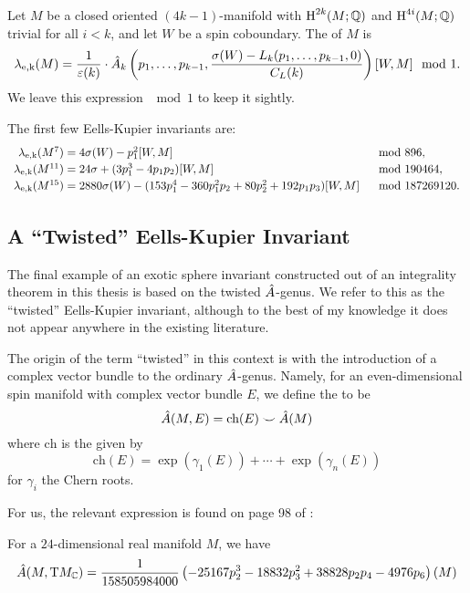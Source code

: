\begin{definition}
	Let $M$ be a closed oriented $(4k-1)$-manifold with $\operatorname{H}^{2k}(M;\mathbb{Q})$ and $\operatorname{H}^{4i}(M;\mathbb{Q})$ trivial for all $i<k$, and let $W$ be a spin coboundary. The  of $M$ is
	\[
		\lambda_{\mathrm{e,k}}(M) = \frac{1}{\varepsilon(k)}\cdot {\hat{A}}_k\left(p_1, \ldots, p_{k-1}, \frac{\sigma(W)-L_k(p_1,\ldots, p_{k-1},0)}{C_L(k)}\right)[W,M]\mod 1.
	\]
	We leave this expression $\mod 1$ to keep it sightly.
\end{definition}

\begin{example}
	The first few Eells-Kupier invariants are:
	\[
		\renewcommand{\arraystretch}{1.2}
		\begin{array}{r@{\;}ll}
			\ekinv(M^7)
			 & = 4\sigma(W) - p_1^2[W, M]
			 & \mod 896,                                                       \\
			\ekinv(M^{11})
			 & = 24\sigma + (3p_1^3-4p_1p_2)[W,M]
			 & \mod 190464,                                                    \\
			\ekinv(M^{15})
			 & = 2880\sigma(W) - (153p_1^4-360p_1^2p_2+80p_2^2+192p_1p_3)[W,M]
			 & \mod 187269120.
		\end{array}
	\]
\end{example}

\subsection{A ``Twisted'' Eells-Kupier Invariant}

The final example of an exotic sphere invariant constructed out of an integrality theorem in this thesis is based on the twisted ${\hat{A}}$-genus. We refer to this as the ``twisted'' Eells-Kupier invariant, although to the best of my knowledge it does not appear anywhere in the existing literature.

The origin of the term ``twisted'' in this context is with the introduction of a complex vector bundle to the ordinary ${\hat{A}}$-genus.
Namely, for an even-dimensional spin manifold with complex vector bundle $E$, we define the  to be
\[{\hat{A}}(M, E) = \textrm{ch}(E)\smile {\hat{A}}(M)\]
where $\textrm{ch}$ is the  given by
\[
	\textrm{ch}(E) = \exp(\gamma_1(E))+\cdots +\exp(\gamma_n(E))
\]
for $\gamma_i$ the Chern roots.

For us, the relevant expression is found on page 98 of \cite{hopkinsmahowald2002bo8}:
\begin{proposition}
	For a $24$-dimensional real manifold $M$, we have
	\[
		{\hat{A}}(M,\mathrm{T} M_{\mathbb{C}}) = \frac{1}{158505984000}\left(-25167p_2^3 - 18832p_3^2 + 38828p_2p_4 - 4976p_6\right)(M)
	\]
\end{proposition}

